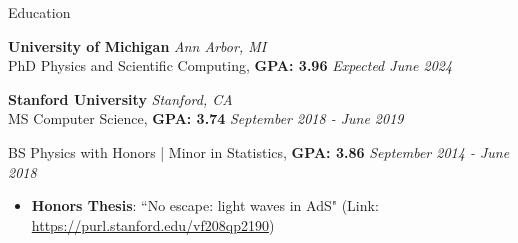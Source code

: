 \documentclass{resume} %
\begin{document}
\begin{rSection}{Education}

{\bf University of Michigan} \hfill {\em Ann Arbor, MI} 
\\ PhD Physics and Scientific Computing, \textbf{GPA: 3.96} \hfill {\em Expected June 2024}
\vspace*{-0.1cm}
%

{\bf Stanford University} \hfill {\em Stanford, CA} 
\\ MS Computer Science, \textbf{GPA: 3.74} \hfill {\em September 2018 - June 2019}

BS Physics with Honors | Minor in Statistics, \textbf{GPA: 3.86} \hfill {\em September 2014 - June 2018}
%
\vspace*{-0.1cm}
\begin{itemize}[itemsep=-0.25em] 

    \item 
    \textbf{Honors Thesis}: ``No escape: light waves in AdS" (Link: \url{https://purl.stanford.edu/vf208qp2190})  

\end{itemize}
%
\vspace*{-0.1cm}
\end{rSection}
\end{document}
